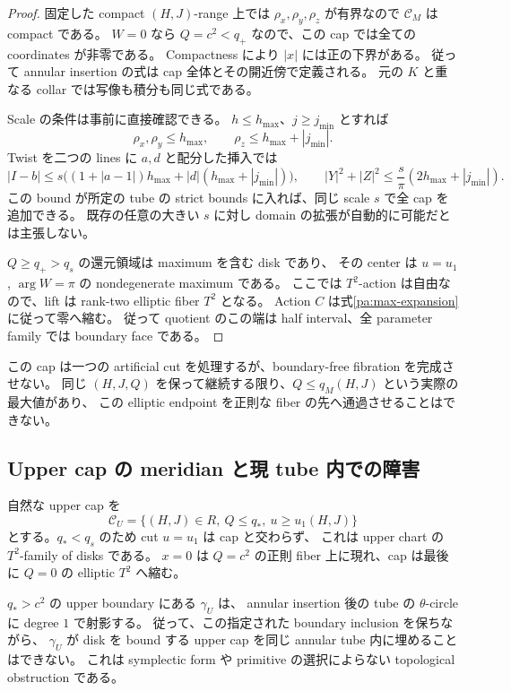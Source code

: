 \begin{proof}
固定した compact $(H,J)$-range 上では $\rho_x,\rho_y,\rho_z$ が有界なので $\mathcal C_M$ は compact である。
$W=0$ なら $Q=c^2<q_+$ なので、この cap では全ての coordinates が非零である。
Compactness により $|x|$ には正の下界がある。
従って annular insertion の式は cap 全体とその開近傍で定義される。
元の $K$ と重なる collar では写像も積分も同じ式である。

Scale の条件は事前に直接確認できる。
$h\le h_{\max}$、$j\ge j_{\min}$ とすれば
\[
 \rho_x,\rho_y\le h_{\max},\qquad
 \rho_z\le h_{\max}+|j_{\min}|.
\]
Twist を二つの lines に $a,d$ と配分した挿入では
\[
 |I-b|\le s\bigl((1+|a-1|)h_{\max}
              +|d|(h_{\max}+|j_{\min}|)\bigr),
 \qquad
 |Y|^2+|Z|^2\le\frac{s}{\pi}(2h_{\max}+|j_{\min}|).
\]
この bound が所定の tube の strict bounds に入れば、同じ scale $s$ で全 cap を追加できる。
既存の任意の大きい $s$ に対し domain の拡張が自動的に可能だとは主張しない。

$Q\ge q_+>q_s$ の還元領域は maximum を含む disk であり、
その center は $u=u_1$, $\arg W=\pi$ の nondegenerate maximum である。
ここでは $T^2$-action は自由なので、lift は rank-two elliptic fiber $T^2$ となる。
Action $C$ は式\eqref{pa:max-expansion}に従って零へ縮む。
従って quotient のこの端は half interval、全 parameter family では boundary face である。
\end{proof}

この cap は一つの artificial cut を処理するが、boundary-free fibration を完成させない。
同じ $(H,J,Q)$ を保って継続する限り、$Q\le q_M(H,J)$ という実際の最大値があり、
この elliptic endpoint を正則な fiber の先へ通過させることはできない。

\subsection{Upper cap の meridian と現 tube 内での障害}

自然な upper cap を
\[
 \mathcal C_U=\{(H,J)\in R,\ Q\le q_*,\ u\ge u_1(H,J)\}
\]
とする。$q_*<q_s$ のため cut $u=u_1$ は cap と交わらず、
これは upper chart の $T^2$-family of disks である。
$x=0$ は $Q=c^2$ の正則 fiber 上に現れ、cap は最後に $Q=0$ の elliptic $T^2$ へ縮む。

\begin{proposition}\label{pa:meridian-obstruction}
$q_*>c^2$ の upper boundary にある $\gamma_U$ は、
annular insertion 後の tube の $\theta$-circle に degree $1$ で射影する。
従って、この指定された boundary inclusion を保ちながら、
$\gamma_U$ が disk を bound する upper cap を同じ annular tube 内に埋めることはできない。
これは symplectic form や primitive の選択によらない topological obstruction である。
\end{proposition}

